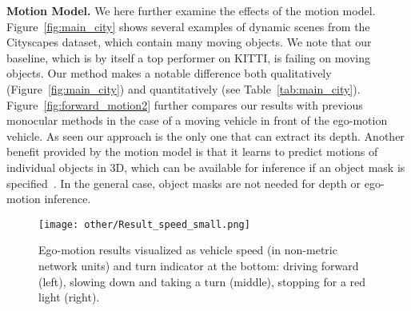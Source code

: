 \documentclass[10pt,twocolumn,letterpaper]{article}
\begin{document}
\textbf{Motion Model.}
We here further examine the effects of the motion model. Figure~\ref{fig:main_city} shows several examples of dynamic scenes from the Cityscapes dataset, which contain many moving objects. We note that our baseline, which is by itself a top performer on KITTI, is failing on moving objects. Our method makes a notable difference both qualitatively (Figure~\ref{fig:main_city}) and quantitatively (see Table~\ref{tab:main_city}).   
Figure~\ref{fig:forward_motion2} further compares our results with previous monocular methods in the case of a moving vehicle in front of the ego-motion vehicle. As seen our approach is the only one that can extract its depth.
Another benefit provided by the motion model is that it learns to predict motions of individual objects in 3D, which can be available for inference if an object mask is specified~\cite{casser2019depth}. In the general case, object masks are not needed for depth or ego-motion inference.

\begin{table} [h!]
\centering
{}
\caption{Quantitative evaluation of odometry on the KITTI Odometry test sequences. Methods using more information than a set of rolling 3-frames are marked (*). Models that are trained on a different part of the dataset are marked ($\dagger$).}
\label{fig:kitti_vo}
\end{table}

\begin{figure*}[t]
    \centering        
    \texttt{[image: other/Result\_speed\_small.png]}
    \caption{Ego-motion results visualized as vehicle speed (in non-metric network units) and turn indicator at the bottom: driving forward (left), slowing down and taking a turn (middle), stopping for a red light (right).}
    \label{fig:ego-res}
\end{figure*}
\end{document}
